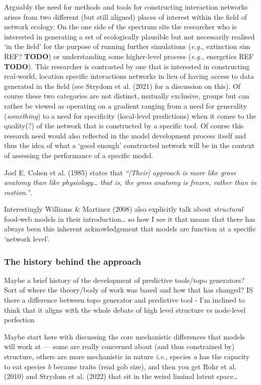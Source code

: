 \documentclass[
]{agujournal2019}
\begin{document}
Arguably the need for methods and tools for constructing interaction
networks arises from two different (but still aligned) places of
interest within the field of network ecology. On the one side of the
spectrum sits the researcher who is interested in generating a set of
ecologically plausible but not necessarily realised `in the field' for
the purpose of running further simulations (\emph{e.g.,} extinction sim
REF? \textbf{TODO}) or understanding some higher-level process
(\emph{e.g.,} energetics REF \textbf{TODO}). This researcher is
contrasted by one that is interested in constructing real-world,
location specific interactions networks in lieu of having access to data
generated in the field (see Strydom et al. (2021) for a discussion on
this). Of course these two categories are not distinct, mutually
exclusive, groups but can rather be viewed as operating on a gradient
ranging from a need for generality (\emph{something}) to a need for
specificity (local-level predictions) when it comes to the quality(?) of
the network that is constructed by a specific tool. Of course this
research need would also reflected in the model development process
itself and thus the idea of what a `good enough' constructed network
will be in the context of assessing the performance of a specific model.

Joel E. Cohen et al. (1985) states that \emph{``{[}Their{]} approach is
more like gross anatomy than like physiology\ldots{} that is, the gross
anatomy is frozen, rather than in motion.''}.

Interestingly Williams \& Martinez (2008) also explicitly talk about
\emph{structural} food-web models in their introduction\ldots{} so how I
see it that means that there has always been this inherent
acknowledgement that models are function at a specific `network level'.

\subsubsection{The history behind the
approach}\label{the-history-behind-the-approach}

Maybe a brief history of the development of predictive tools/topo
generators? Sort of where the theory/body of work was based and how that
has changed? IS there a difference between topo generator and predictive
tool - I'm inclined to think that it aligns with the whole debate of
high level structure vs node-level perfection

Maybe start here with discussing the core mechanistic differences that
models will work at --- some are really concerned about (and thus
constrained by) structure, others are more mechanistic in nature
\emph{i.e.,} species \emph{a} has the capacity to eat species \emph{b}
because traits (read gob size), and then you get Rohr et al. (2010) and
Strydom et al. (2022) that sit in the weird liminal latent space\ldots{}
\end{document}
